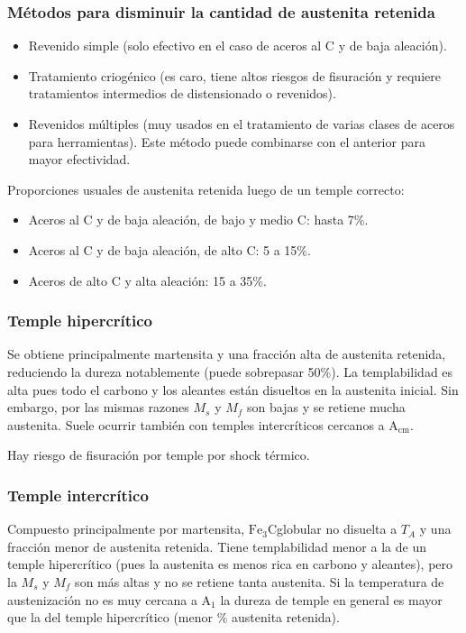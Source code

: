 \documentclass{article}
\newcommand{\Aone}{A\ensuremath{_{1}}}
\newcommand{\Acm}{A\ensuremath{_{\mathrm{cm}}}}
\newcommand{\cementita}{\ensuremath{\mathrm{Fe}_3 \mathrm{C}}}
\begin{document}
\subsubsection{Métodos para disminuir la cantidad de austenita retenida}
\begin{itemize}
    \item Revenido simple (solo efectivo en el caso de aceros al C y de baja aleación).
    \item Tratamiento criogénico (es caro, tiene altos riesgos de fisuración y requiere tratamientos intermedios de distensionado o revenidos).
    \item Revenidos múltiples (muy usados en el tratamiento de varias clases de aceros para herramientas). Este método puede combinarse con el anterior para mayor efectividad.
\end{itemize}


Proporciones usuales de austenita retenida luego de un temple correcto: 
\begin{itemize}
    \item Aceros al C y de baja aleación, de bajo y medio C: hasta 7\%.
    \item Aceros al C y de baja aleación, de alto C: 5 a 15\%.
    \item Aceros de alto C y alta aleación: 15 a 35\%.
\end{itemize}


\subsubsection{Temple hipercrítico}
Se obtiene principalmente martensita y una fracción alta de austenita retenida, reduciendo la dureza notablemente (puede sobrepasar 50\%). La templabilidad es alta pues todo el carbono y los aleantes están disueltos en la austenita inicial. Sin embargo, por las mismas razones $M_s$ y $M_f$ son bajas y se retiene mucha austenita. Suele ocurrir también con temples intercríticos cercanos a \Acm{}.

Hay riesgo de fisuración por temple por shock térmico.

\subsubsection{Temple intercrítico}
Compuesto principalmente por martensita, \cementita globular no disuelta a $T_A$ y una fracción menor de austenita retenida. Tiene templabilidad menor a la de un temple hipercrítico (pues la austenita es menos rica en carbono y aleantes), pero la $M_s$ y $M_f$ son más altas y no se retiene tanta austenita. Si la temperatura de austenización no es muy cercana a \Aone{} la dureza de temple en general es mayor que la del temple hipercrítico (menor \% austenita retenida). 
\end{document}
